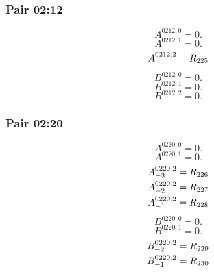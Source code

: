 \documentclass[11pt,a4paper]{article}
\begin{document}
\subsubsection{Pair 02:12}
\begin{equation}
A^{0212;0}=0.
\label{eq:cat-map-192}
\end{equation}
\begin{equation}
A^{0212;1}=0.
\label{eq:cat-map-193}
\end{equation}
\begin{equation}
\shortstack[l]{$\displaystyle A^{0212;2}_{-1}=R_{225}$}
\label{eq:cat-map-194}
\end{equation}
\begin{equation}
B^{0212;0}=0.
\label{eq:cat-map-195}
\end{equation}
\begin{equation}
B^{0212;1}=0.
\label{eq:cat-map-196}
\end{equation}
\begin{equation}
B^{0212;2}=0.
\label{eq:cat-map-197}
\end{equation}
\subsubsection{Pair 02:20}
\begin{equation}
A^{0220;0}=0.
\label{eq:cat-map-198}
\end{equation}
\begin{equation}
A^{0220;1}=0.
\label{eq:cat-map-199}
\end{equation}
\begin{equation}
\shortstack[l]{$\displaystyle A^{0220;2}_{-3}=R_{226}$\\
$\displaystyle A^{0220;2}_{-2}=R_{227}$\\
$\displaystyle A^{0220;2}_{-1}=R_{228}$}
\label{eq:cat-map-200}
\end{equation}
\begin{equation}
B^{0220;0}=0.
\label{eq:cat-map-201}
\end{equation}
\begin{equation}
B^{0220;1}=0.
\label{eq:cat-map-202}
\end{equation}
\begin{equation}
\shortstack[l]{$\displaystyle B^{0220;2}_{-2}=R_{229}$\\
$\displaystyle B^{0220;2}_{-1}=R_{230}$}
\label{eq:cat-map-203}
\end{equation}
\end{document}
